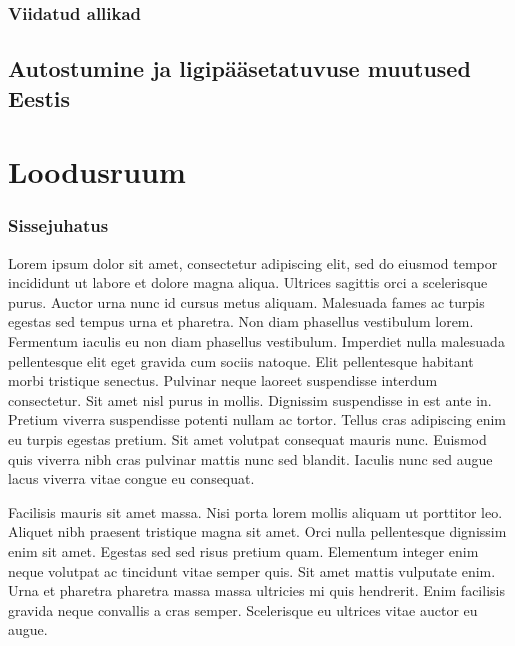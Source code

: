 \documentclass[]{book}
\begin{document}
\hypertarget{viidatud-allikad-1}{%
\subsection*{Viidatud allikad}\label{viidatud-allikad-1}}

\printbibliography[segment=\therefsegment,heading=subbibliography]

\hypertarget{chapter24}{%
\section{Autostumine ja ligipääsetatuvuse muutused Eestis}\label{chapter24}}

\hypertarget{chapter30}{%
\chapter{Loodusruum}\label{chapter30}}

\hypertarget{sissejuhatus-2}{%
\subsection*{Sissejuhatus}\label{sissejuhatus-2}}

Lorem ipsum dolor sit amet, consectetur adipiscing elit, sed do eiusmod tempor incididunt ut labore et dolore magna aliqua. Ultrices sagittis orci a scelerisque purus. Auctor urna nunc id cursus metus aliquam. Malesuada fames ac turpis egestas sed tempus urna et pharetra. Non diam phasellus vestibulum lorem. Fermentum iaculis eu non diam phasellus vestibulum. Imperdiet nulla malesuada pellentesque elit eget gravida cum sociis natoque. Elit pellentesque habitant morbi tristique senectus. Pulvinar neque laoreet suspendisse interdum consectetur. Sit amet nisl purus in mollis. Dignissim suspendisse in est ante in. Pretium viverra suspendisse potenti nullam ac tortor. Tellus cras adipiscing enim eu turpis egestas pretium. Sit amet volutpat consequat mauris nunc. Euismod quis viverra nibh cras pulvinar mattis nunc sed blandit. Iaculis nunc sed augue lacus viverra vitae congue eu consequat.

Facilisis mauris sit amet massa. Nisi porta lorem mollis aliquam ut porttitor leo. Aliquet nibh praesent tristique magna sit amet. Orci nulla pellentesque dignissim enim sit amet. Egestas sed sed risus pretium quam. Elementum integer enim neque volutpat ac tincidunt vitae semper quis. Sit amet mattis vulputate enim. Urna et pharetra pharetra massa massa ultricies mi quis hendrerit. Enim facilisis gravida neque convallis a cras semper. Scelerisque eu ultrices vitae auctor eu augue.
\end{document}
